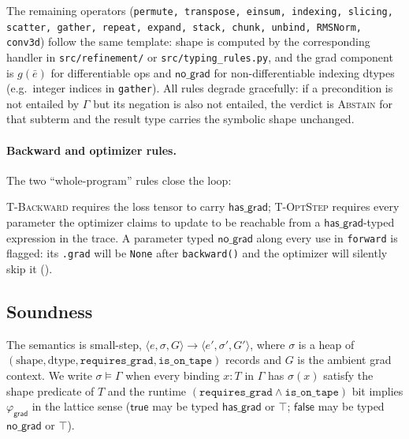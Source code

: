 The remaining operators (\texttt{permute, transpose, einsum,
indexing, slicing, scatter, gather, repeat, expand, stack, chunk,
unbind, RMSNorm, conv3d}) follow the same template: shape is
computed by the corresponding handler in \texttt{src/refinement/}
or \texttt{src/typing\_rules.py}, and the grad component is
$g(\bar e)$ for differentiable ops and $\mathsf{no\_grad}$ for
non-differentiable indexing dtypes (e.g.\ integer indices in
\texttt{gather}). All rules degrade gracefully: if a precondition
is not entailed by $\Gamma$ but its negation is also not entailed,
the verdict is \textsc{Abstain} for that subterm and the result
type carries the symbolic shape unchanged.

\paragraph{Backward and optimizer rules.} The two
``whole-program'' rules close the loop:

{\small
{}}

\textsc{T-Backward} requires the loss tensor to carry
$\mathsf{has\_grad}$; \textsc{T-OptStep} requires every parameter
the optimizer claims to update to be reachable from a
$\mathsf{has\_grad}$-typed expression in the trace. A parameter
typed $\mathsf{no\_grad}$ along every use in \texttt{forward} is
flagged: its \texttt{.grad} will be \texttt{None} after
\texttt{backward()} and the optimizer will silently skip it
().

\subsection{Soundness}
\label{sec:rt:soundness}

The semantics is small-step, $\langle e,\sigma,G\rangle\to\langle
e',\sigma',G'\rangle$, where $\sigma$ is a heap of
$(\mathrm{shape},\mathrm{dtype},\mathtt{requires\_grad},\mathtt{is\_on\_tape})$
records and $G$ is the ambient grad context. We write
$\sigma\models\Gamma$ when every binding $x\!:\!T$ in $\Gamma$ has
$\sigma(x)$ satisfy the shape predicate of $T$ and the runtime
$(\mathtt{requires\_grad}\wedge\mathtt{is\_on\_tape})$ bit
implies $\varphi_{\mathsf{grad}}$ in the lattice sense
($\mathsf{true}$ may be typed $\mathsf{has\_grad}$ or $\top$;
$\mathsf{false}$ may be typed $\mathsf{no\_grad}$ or $\top$).


